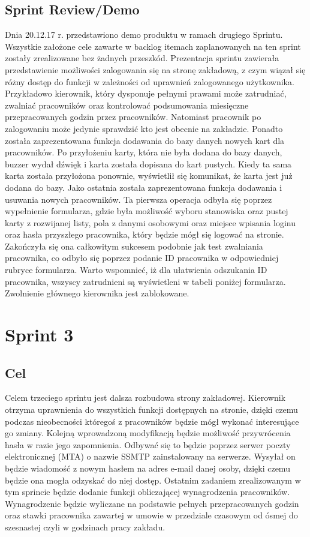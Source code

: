 \documentclass[a4paper]{article}
\begin{document}
\subsection{Sprint Review/Demo}
Dnia 20.12.17 r. przedstawiono demo produktu w ramach drugiego Sprintu. Wszystkie założone cele zawarte w backlog itemach zaplanowanych na ten sprint zostały zrealizowane bez żadnych przeszkód. Prezentacja sprintu zawierała przedstawienie możliwości zalogowania się na stronę zakładową, z czym wiązał się różny dostęp do funkcji w zależności od uprawnień zalogowanego użytkownika. Przykładowo kierownik, który dysponuje pełnymi prawami może zatrudniać, zwalniać pracowników oraz kontrolować podsumowania miesięczne przepracowanych godzin przez pracowników. Natomiast pracownik po zalogowaniu może jedynie sprawdzić kto jest obecnie na zakładzie. Ponadto została zaprezentowana funkcja dodawania do bazy danych nowych kart dla pracowników. Po przyłożeniu karty, która nie była dodana do bazy danych, buzzer wydał dźwięk i karta została dopisana do kart pustych. Kiedy ta sama karta została przyłożona ponownie, wyświetlił się komunikat, że karta jest już dodana do bazy. Jako ostatnia została zaprezentowana funkcja dodawania i usuwania nowych pracowników. Ta pierwsza operacja odbyła się poprzez wypełnienie formularza, gdzie była możliwość wyboru stanowiska oraz pustej karty z rozwijanej listy, pola z danymi osobowymi oraz miejsce wpisania loginu oraz hasła przyszłego pracownika, który będzie mógł się logować na stronie. Zakończyła się ona całkowitym sukcesem podobnie jak test zwalniania pracownika, co odbyło się poprzez podanie ID pracownika w odpowiedniej rubryce formularza. Warto wspomnieć, iż dla ułatwienia odszukania ID pracownika, wszyscy zatrudnieni są wyświetleni w tabeli poniżej formularza. Zwolnienie głównego kierownika jest zablokowane.


\section{Sprint 3}

\subsection{Cel} Celem trzeciego sprintu jest dalsza rozbudowa strony zakładowej. Kierownik otrzyma uprawnienia do wszystkich funkcji dostępnych na stronie, dzięki czemu podczas nieobecności któregoś z pracowników będzie mógł wykonać interesujące go zmiany. Kolejną wprowadzoną modyfikacją będzie możliwość przywrócenia hasła w razie jego zapomnienia. Odbywać się to będzie poprzez serwer poczty elektronicznej (MTA) o nazwie SSMTP  zainstalowany na serwerze. Wysyłał on będzie wiadomość z nowym hasłem na adres e-mail danej osoby, dzięki czemu będzie ona mogła odzyskać do niej dostęp. Ostatnim zadaniem zrealizowanym w tym sprincie będzie dodanie funkcji obliczającej wynagrodzenia pracowników. Wynagrodzenie będzie wyliczane na podstawie pełnych przepracowanych godzin oraz stawki pracownika zawartej w umowie w przedziale czasowym od ósmej do szesnastej czyli w godzinach pracy zakładu. 
\end{document}

